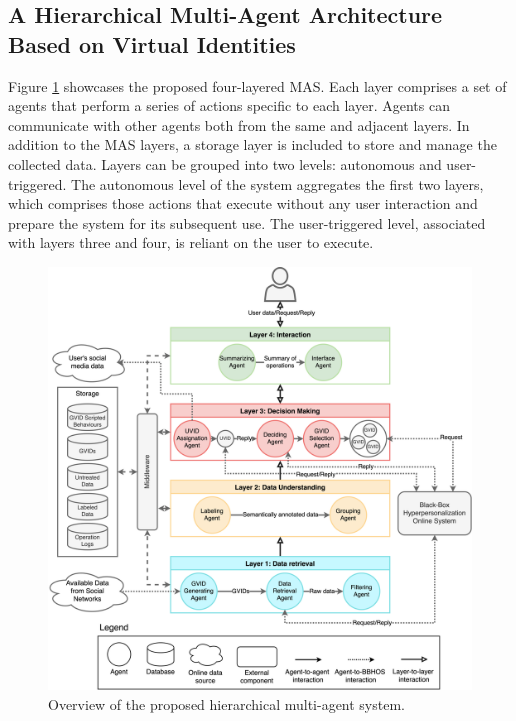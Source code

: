 \subsection{A Hierarchical Multi-Agent Architecture Based on Virtual Identities}\label{6_sec:subsec:mas_description}

Figure \ref{fig:overview_mas} showcases the proposed four-layered MAS. Each layer comprises a set of agents that perform a series of actions specific to each layer. Agents can communicate with other agents both from the same and adjacent layers. In addition to the MAS layers, a storage layer is included to store and manage the collected data. Layers can be grouped into two levels: autonomous and user-triggered. The autonomous level of the system aggregates the first two layers, which comprises those actions that execute without any user interaction and prepare the system for its subsequent use. The user-triggered level, associated with layers three and four, is reliant on the user to execute. 

\begin{figure}[t]
    \centering
    \includegraphics[width=.9\linewidth]{6_kbsextractiondl/figures/Overview_MAS.eps}
    \caption{Overview of the proposed hierarchical multi-agent system.}
    \label{fig:overview_mas}
\end{figure}

